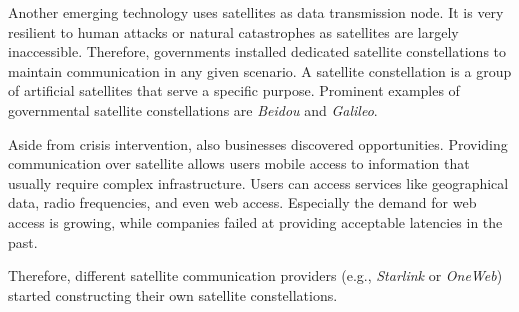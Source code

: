 Another emerging technology uses satellites as data transmission node. It is very resilient to human attacks or natural catastrophes as satellites are largely inaccessible. Therefore, governments installed dedicated satellite constellations to maintain communication in any given scenario. A satellite constellation is a group of artificial satellites that serve a specific purpose. Prominent examples of governmental satellite constellations are \textit{Beidou} and \textit{Galileo}.

Aside from crisis intervention, also businesses discovered opportunities. Providing communication over satellite allows users mobile access to information that usually require complex infrastructure. Users can access services like geographical data, radio frequencies, and even web access. Especially the demand for web access is growing, while companies failed at providing acceptable latencies in the past.

Therefore, different satellite communication providers (e.g., \textit{Starlink} or \textit{OneWeb}) started constructing their own satellite constellations.
